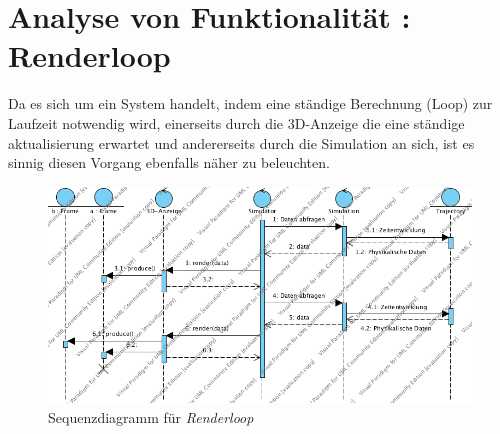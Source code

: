 
\section{Analyse von Funktionalität :  Renderloop}
Da es sich um ein System handelt, indem eine ständige Berechnung (Loop) zur Laufzeit notwendig wird, einerseits durch die 3D-Anzeige die eine ständige aktualisierung erwartet und andererseits durch
die Simulation an sich, ist es sinnig diesen Vorgang ebenfalls näher zu beleuchten.

\begin{figure}
\includegraphics[width=16cm]{bilder/render_loop}
\caption{Sequenzdiagramm für \textit{Renderloop}}
\label{labelname}
\end{figure}

